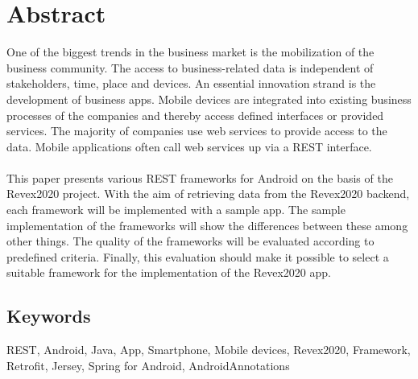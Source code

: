 \chapter*{Abstract}
One of the biggest trends in the business market is the mobilization of the business community. The access to business-related data is independent of stakeholders, time, place and devices. An essential innovation strand is the development of business apps. Mobile devices are integrated into existing business processes of the companies and thereby access defined interfaces or provided services. The majority of companies use web services to provide access to the data. Mobile applications often call web services up via a REST interface.
\\\\
This paper presents various REST frameworks for Android on the basis of the Revex2020 project. With the aim of retrieving data from the Revex2020 backend, each framework will be implemented with a sample app. The sample implementation of the frameworks will show the differences between these among other things. The quality of the frameworks will be evaluated according to predefined criteria. Finally, this evaluation should make it possible to select a suitable framework for the implementation of the Revex2020 app.

\section*{Keywords}
REST, Android, Java, App, Smartphone, Mobile devices, Revex2020, Framework, Retrofit, Jersey, Spring for Android, AndroidAnnotations

